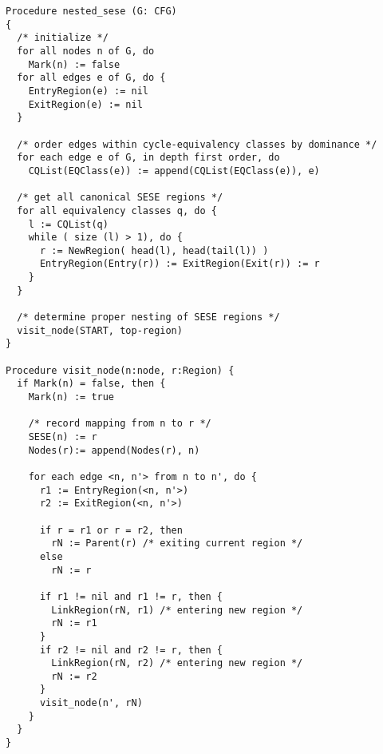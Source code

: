 \begin{verbatim}
Procedure nested_sese (G: CFG)
{
  /* initialize */
  for all nodes n of G, do
    Mark(n) := false
  for all edges e of G, do {
    EntryRegion(e) := nil
    ExitRegion(e) := nil
  }

  /* order edges within cycle-equivalency classes by dominance */
  for each edge e of G, in depth first order, do
    CQList(EQClass(e)) := append(CQList(EQClass(e)), e)

  /* get all canonical SESE regions */
  for all equivalency classes q, do {
    l := CQList(q)
    while ( size (l) > 1), do {
      r := NewRegion( head(l), head(tail(l)) )
      EntryRegion(Entry(r)) := ExitRegion(Exit(r)) := r
    }
  }

  /* determine proper nesting of SESE regions */
  visit_node(START, top-region)
}

Procedure visit_node(n:node, r:Region) {
  if Mark(n) = false, then {
    Mark(n) := true

    /* record mapping from n to r */
    SESE(n) := r
    Nodes(r):= append(Nodes(r), n)

    for each edge <n, n'> from n to n', do {
      r1 := EntryRegion(<n, n'>)
      r2 := ExitRegion(<n, n'>)

      if r = r1 or r = r2, then
        rN := Parent(r) /* exiting current region */
      else
        rN := r

      if r1 != nil and r1 != r, then {
        LinkRegion(rN, r1) /* entering new region */
        rN := r1
      }
      if r2 != nil and r2 != r, then {
        LinkRegion(rN, r2) /* entering new region */
        rN := r2
      }
      visit_node(n', rN)
    }
  }
}
\end{verbatim}
